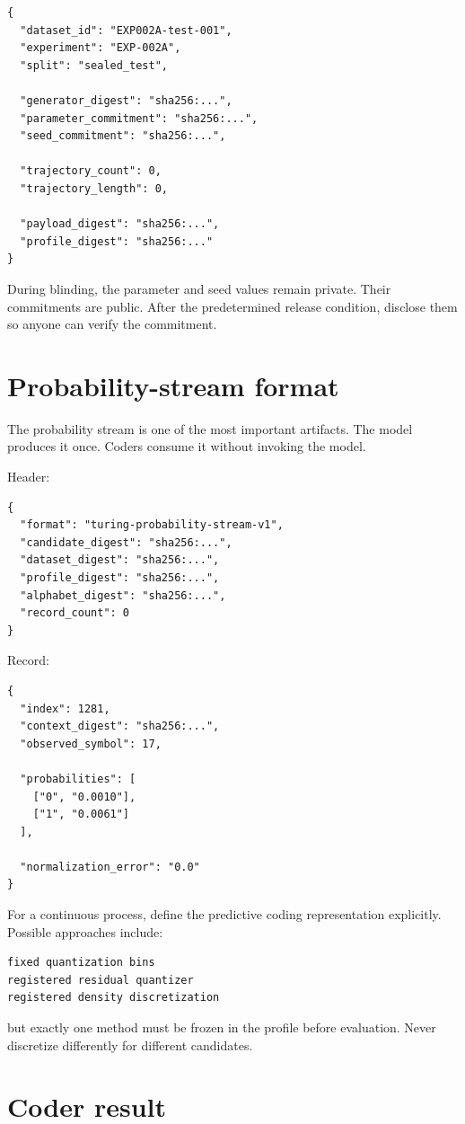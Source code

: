 \documentclass[11pt]{article}
\begin{document}
\begin{verbatim}
{
  "dataset_id": "EXP002A-test-001",
  "experiment": "EXP-002A",
  "split": "sealed_test",

  "generator_digest": "sha256:...",
  "parameter_commitment": "sha256:...",
  "seed_commitment": "sha256:...",

  "trajectory_count": 0,
  "trajectory_length": 0,

  "payload_digest": "sha256:...",
  "profile_digest": "sha256:..."
}
\end{verbatim}
During blinding, the parameter and seed values remain private. Their commitments are public. After the predetermined release condition, disclose them so anyone can verify the commitment.

\section{Probability-stream format}

The probability stream is one of the most important artifacts. The model produces it once. Coders consume it without invoking the model.

Header:
\begin{verbatim}
{
  "format": "turing-probability-stream-v1",
  "candidate_digest": "sha256:...",
  "dataset_digest": "sha256:...",
  "profile_digest": "sha256:...",
  "alphabet_digest": "sha256:...",
  "record_count": 0
}
\end{verbatim}
Record:
\begin{verbatim}
{
  "index": 1281,
  "context_digest": "sha256:...",
  "observed_symbol": 17,

  "probabilities": [
    ["0", "0.0010"],
    ["1", "0.0061"]
  ],

  "normalization_error": "0.0"
}
\end{verbatim}
For a continuous process, define the predictive coding representation explicitly. Possible approaches include:
\begin{verbatim}
fixed quantization bins
registered residual quantizer
registered density discretization
\end{verbatim}
but exactly one method must be frozen in the profile before evaluation. Never discretize differently for different candidates.

\section{Coder result}
\end{document}
